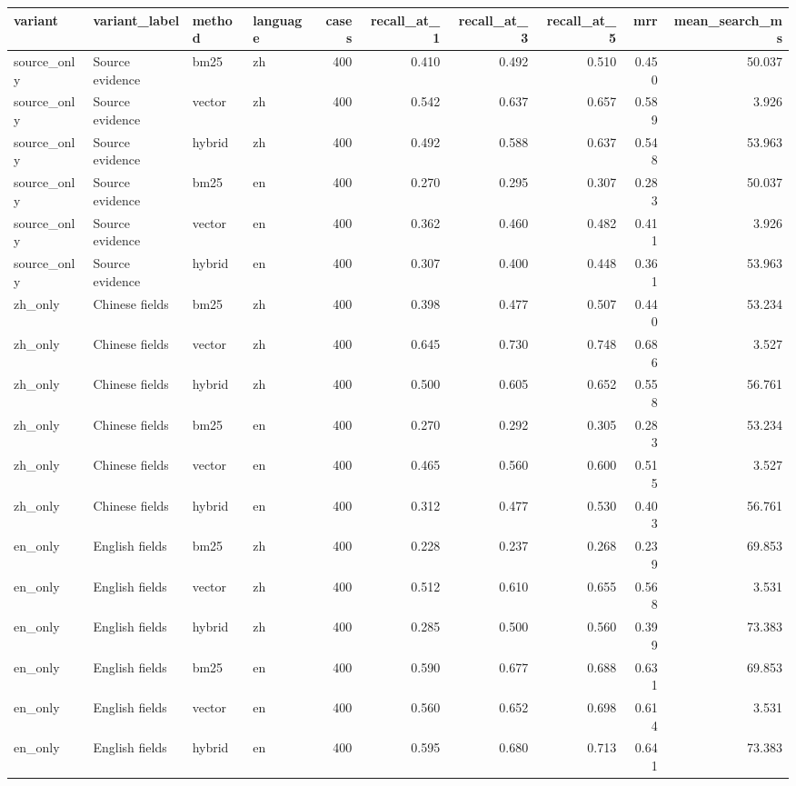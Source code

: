 \begin{tabular}{llllrrrrrr}
\toprule
variant & variant\_label & method & language & cases & recall\_at\_1 & recall\_at\_3 & recall\_at\_5 & mrr & mean\_search\_ms \\
\midrule
source\_only & Source evidence & bm25 & zh & 400 & 0.410 & 0.492 & 0.510 & 0.450 & 50.037 \\
source\_only & Source evidence & vector & zh & 400 & 0.542 & 0.637 & 0.657 & 0.589 & 3.926 \\
source\_only & Source evidence & hybrid & zh & 400 & 0.492 & 0.588 & 0.637 & 0.548 & 53.963 \\
source\_only & Source evidence & bm25 & en & 400 & 0.270 & 0.295 & 0.307 & 0.283 & 50.037 \\
source\_only & Source evidence & vector & en & 400 & 0.362 & 0.460 & 0.482 & 0.411 & 3.926 \\
source\_only & Source evidence & hybrid & en & 400 & 0.307 & 0.400 & 0.448 & 0.361 & 53.963 \\
zh\_only & Chinese fields & bm25 & zh & 400 & 0.398 & 0.477 & 0.507 & 0.440 & 53.234 \\
zh\_only & Chinese fields & vector & zh & 400 & 0.645 & 0.730 & 0.748 & 0.686 & 3.527 \\
zh\_only & Chinese fields & hybrid & zh & 400 & 0.500 & 0.605 & 0.652 & 0.558 & 56.761 \\
zh\_only & Chinese fields & bm25 & en & 400 & 0.270 & 0.292 & 0.305 & 0.283 & 53.234 \\
zh\_only & Chinese fields & vector & en & 400 & 0.465 & 0.560 & 0.600 & 0.515 & 3.527 \\
zh\_only & Chinese fields & hybrid & en & 400 & 0.312 & 0.477 & 0.530 & 0.403 & 56.761 \\
en\_only & English fields & bm25 & zh & 400 & 0.228 & 0.237 & 0.268 & 0.239 & 69.853 \\
en\_only & English fields & vector & zh & 400 & 0.512 & 0.610 & 0.655 & 0.568 & 3.531 \\
en\_only & English fields & hybrid & zh & 400 & 0.285 & 0.500 & 0.560 & 0.399 & 73.383 \\
en\_only & English fields & bm25 & en & 400 & 0.590 & 0.677 & 0.688 & 0.631 & 69.853 \\
en\_only & English fields & vector & en & 400 & 0.560 & 0.652 & 0.698 & 0.614 & 3.531 \\
en\_only & English fields & hybrid & en & 400 & 0.595 & 0.680 & 0.713 & 0.641 & 73.383 \\

\end{tabular}
